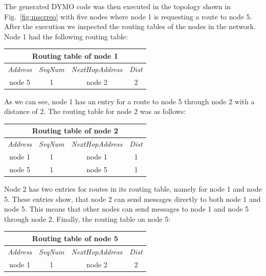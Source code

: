 The generated DYMO code was then executed in the topology shown in Fig.~\ref{fig:mscrreq} with five nodes where node 1 is requesting a route to node 5. After the execution we inspected the routing tables of the nodes in the network. Node 1 had the following routing table:

\begin{center}
\begin{tabular}{|c|c|c|c|}
\hline
\multicolumn{4}{|c|}{\textbf{Routing table of node 1}} \\
\hline
\textit{Address} & \textit{SeqNum} & \textit{NextHopAddress} & \textit{Dist} \\
\hline
node 5 & 1 & node 2 & 2 \\
\hline
\end{tabular}
\end{center}

\noindent As we can see, node 1 has an entry for a route to node 5 through node 2 with a distance of 2. The routing table for node 2 was as follows:

\begin{center}
\begin{tabular}{|c|c|c|c|}
\hline
\multicolumn{4}{|c|}{\textbf{Routing table of node 2}} \\
\hline
\textit{Address} & \textit{SeqNum} & \textit{NextHopAddress} & \textit{Dist} \\
\hline
node 1 & 1 & node 1 & 1 \\
\hline
node 5 & 1 & node 5 & 1 \\
\hline
\end{tabular}
\end{center}

\noindent Node 2 has two entries for routes in its routing table, namely for node 1 and node 5. These entries show, that node 2 can send messages directly to both node 1 and node 5. This means that other nodes can send messages to node 1 and node 5 through node 2. Finally, the routing table on node 5:

\begin{center}
\begin{tabular}{|c|c|c|c|}
\hline
\multicolumn{4}{|c|}{\textbf{Routing table of node 5}} \\
\hline
\textit{Address} & \textit{SeqNum} & \textit{NextHopAddress} & \textit{Dist} \\
\hline
node 1 & 1 & node 2 & 2 \\
\hline
\end{tabular}
\end{center}


